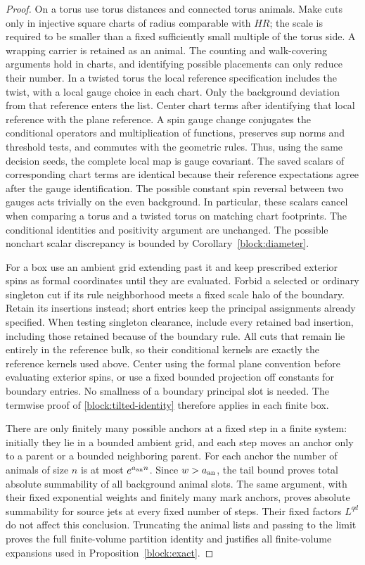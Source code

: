 \begin{proof}
On a torus use torus distances and connected torus animals.  Make cuts
only in injective square charts of radius comparable with $HR$; the
scale is required to be smaller than a fixed sufficiently small
multiple of the torus side.  A wrapping carrier is retained as an
animal.  The counting and walk-covering arguments hold in charts,
and identifying possible placements can only reduce their number.
In a twisted torus the local reference specification includes the
twist, with a local gauge choice in each chart.  Only the background
deviation from that reference enters the list.  Center chart terms
after identifying that local reference with the plane reference.
A spin gauge change conjugates the conditional operators and
multiplication of functions, preserves sup norms and threshold tests,
and commutes with the geometric rules.  Thus, using the same decision
seeds, the complete local map is gauge covariant.  The saved scalars
of corresponding chart terms are identical because their reference
expectations agree after the gauge identification.  The possible
constant spin reversal between two gauges acts trivially on the
even background.  In particular,
these scalars cancel when comparing a torus and a twisted torus on
matching chart footprints.  The conditional identities and positivity
argument are unchanged.  The possible nonchart scalar discrepancy
is bounded by Corollary~\ref{block:diameter}.

For a box use an ambient grid extending past it and keep prescribed
exterior spins as formal coordinates until they are evaluated.  Forbid
a selected or ordinary singleton cut if its rule neighborhood meets
a fixed scale halo of the boundary.  Retain its insertions instead;
short entries keep the principal assignments already specified.
When testing singleton clearance, include every retained bad
insertion, including those retained because of the boundary rule.
All cuts that remain lie entirely in the reference bulk, so their
conditional kernels are exactly the reference kernels used above.
Center using the formal plane convention before evaluating exterior
spins, or use a fixed bounded projection off constants for boundary
entries.  No smallness of a boundary principal slot is needed.
The termwise proof of \eqref{block:tilted-identity} therefore applies
in each finite box.

There are only finitely many possible anchors at a fixed step in a
finite system: initially they lie in a bounded ambient grid, and each
step moves an anchor only to a parent or a bounded neighboring parent.
For each anchor the number of animals of size $n$ is at most
$e^{a_{\rm an}n}$.  Since $w>a_{\rm an}$, the tail bound proves total
absolute summability of all background animal slots.  The same
argument, with their fixed exponential weights and finitely many
mark anchors, proves absolute summability for source jets at every
fixed number of steps.  Their fixed factors $L^{qd}$ do not affect
this conclusion.  Truncating the animal lists and passing to the
limit proves the full finite-volume partition identity and justifies
all finite-volume expansions used in Proposition~\ref{block:exact}.


\end{proof}
